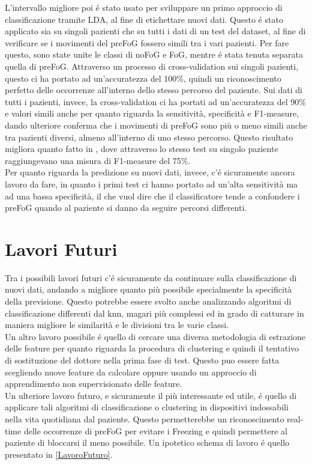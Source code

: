 L'intervallo migliore poi é stato usato per sviluppare un primo approccio di classificazione tramite LDA, al fine di etichettare nuovi dati. Questo é stato applicato sia su singoli pazienti che su tutti i dati di un test del dataset, al fine di verificare se i movimenti del preFoG fossero simili tra i vari pazienti. Per fare questo, sono state unite le classi di noFoG e FoG, mentre é stata tenuta separata quella di preFoG. Attraverso un processo di cross-validation sui singoli pazienti, questo ci ha portato ad un'accuratezza del 100\%, quindi un riconoscimento perfetto delle occorrenze all'interno dello stesso percorso del paziente. Sui dati di tutti i pazienti, invece, la cross-validation ci ha portati ad un'accuratezza del 90\% e valori simili anche per quanto riguarda la sensitività, specificità e F1-measure, dando ulteriore conferma che i movimenti di preFoG sono più o meno simili anche tra pazienti diversi, almeno all'interno di uno stesso percorso. Questo risultato migliora quanto fatto in \cite{12}, dove attraverso lo stesso test su singolo paziente raggiungevano una misura di F1-measure del 75\%.\\
Per quanto riguarda la predizione su nuovi dati, invece, c'é sicuramente ancora lavoro da fare, in quanto i primi test ci hanno portato ad un'alta sensitività ma ad una bassa specificità, il che vuol dire che il classificatore tende a confondere i preFoG quando al paziente si danno da seguire percorsi differenti.
\section{Lavori Futuri}
Tra i possibili lavori futuri c'é sicuramente da continuare sulla classificazione di nuovi dati, andando a migliore quanto più possibile specialmente la specificità della previsione. Questo potrebbe essere svolto anche analizzando algoritmi di classificazione differenti dal knn, magari più complessi ed in grado di catturare in maniera migliore le similarità e le divisioni tra le varie classi.\\
Un altro lavoro possibile é quello di cercare una diversa metodologia di estrazione delle feature per quanto riguarda la procedura di clustering e quindi il tentativo di sostituzione del dottore nella prima fase di test. Questo puo essere fatta scegliendo nuove feature da calcolare oppure usando un approccio di apprendimento non supervisionato delle feature.\\
Un ulteriore lavoro futuro, e sicuramente il più interessante ed utile, é quello di applicare tali algoritmi di classificazione o clustering in dispositivi indossabili nella vita quotidiana dal paziente. Questo permetterebbe un riconoscimento real-time delle occorrenze di preFoG per evitare i Freezing e quindi permettere al paziente di bloccarsi il meno possibile. Un ipotetico schema di lavoro é quello presentato in \ref{LavoroFuturo}.

